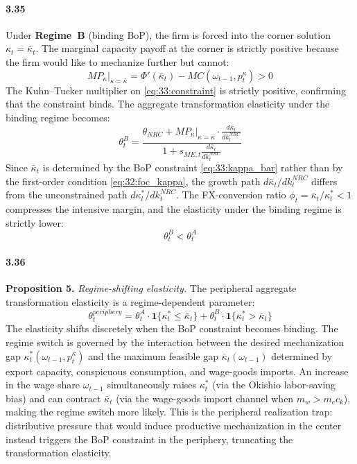\paragraph{3.35}
Under \textbf{Regime~B} (binding BoP), the firm is forced
into the corner solution $\kappa_t = \bar{\kappa}_t$. The
marginal capacity payoff at the corner is strictly positive
because the firm would like to mechanize further but cannot:
\begin{equation}
	MP_\kappa\big|_{\kappa=\bar{\kappa}}
	= \Phi'(\bar{\kappa}_t) - MC(\omega_{t-1}, p^\kappa_t) > 0
	\label{eq:33:MP_corner}
\end{equation}
The Kuhn--Tucker multiplier on \eqref{eq:33:constraint} is
strictly positive, confirming that the constraint binds. The
aggregate transformation elasticity under the binding regime
becomes:
\begin{equation}
	\theta^{B}_t
	= \frac{\theta_{NRC}
		+ MP_\kappa\big|_{\kappa=\bar{\kappa}}
		\cdot \frac{d\bar{\kappa}_t}{dk^{NRC}_t}}
	{1 + s_{ME,t}\frac{d\bar{\kappa}_t}{dk^{NRC}_t}}
	\label{eq:33:theta_B}
\end{equation}
Since $\bar{\kappa}_t$ is determined by the BoP constraint
\eqref{eq:33:kappa_bar} rather than by the first-order
condition \eqref{eq:32:foc_kappa}, the growth path
$d\bar{\kappa}_t / dk^{NRC}_t$ differs from the unconstrained
path $d\kappa_t^* / dk^{NRC}_t$. The FX-conversion ratio
$\phi_t = \bar{\kappa}_t / \kappa_t^* < 1$ compresses the
intensive margin, and the elasticity under the binding regime
is strictly lower:
\begin{equation}
	\theta^{B}_t < \theta^{A}_t
	\label{eq:33:theta_inequality}
\end{equation}

\paragraph{3.36}
\textbf{Proposition 5.} \textit{Regime-shifting elasticity.}
The peripheral aggregate transformation elasticity is a
regime-dependent parameter:
\begin{equation}
	\theta^{periphery}_t
	= \theta^{A}_t \cdot \mathbf{1}\{\kappa_t^* \le \bar{\kappa}_t\}
	+ \theta^{B}_t \cdot \mathbf{1}\{\kappa_t^* > \bar{\kappa}_t\}
	\label{eq:33:theta_regime}
\end{equation}
The elasticity shifts discretely when the BoP constraint
becomes binding. The regime switch is governed by the
interaction between the desired mechanization gap
$\kappa_t^*(\omega_{t-1}, p^\kappa_t)$ and the maximum
feasible gap $\bar{\kappa}_t(\omega_{t-1})$ determined by
export capacity, conspicuous consumption, and wage-goods
imports. An increase in the wage share $\omega_{t-1}$
simultaneously raises $\kappa_t^*$ (via the Okishio
labor-saving bias) and can contract $\bar{\kappa}_t$ (via
the wage-goods import channel when $m_w > m_c c_k$), making
the regime switch more likely. This is the peripheral
realization trap: distributive pressure that would induce
productive mechanization in the center instead triggers the
BoP constraint in the periphery, truncating the
transformation elasticity.

